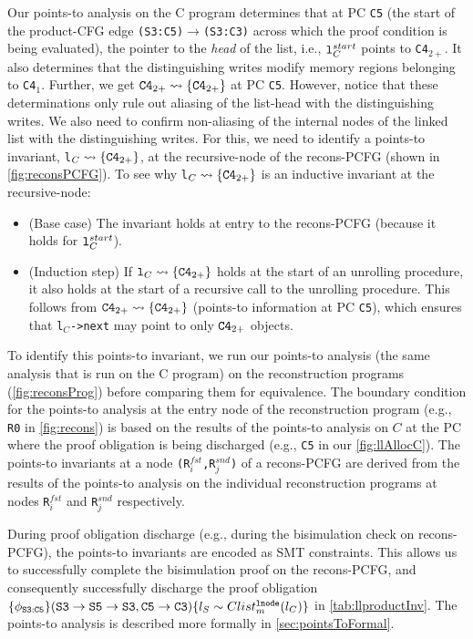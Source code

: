 Our points-to analysis on
the C program determines that at PC {\tt C5} (the start of
the product-CFG edge {\tt (S3:C5)$\rightarrow$(S3:C3)} across which the proof
condition is being evaluated),
the pointer to the {\em head}
of the list, i.e., ${\tt l}^{start}_C$
points to {\tt C4}$_{2+}$. It also determines that the distinguishing
writes modify memory regions belonging to {\tt C4}$_1$. 
Further, we get ${\tt C4}_{2+}\rightsquigarrow{}\{{\tt C4}_{2+}\}$ at PC {\tt C5}.
However,
notice that these determinations only rule out aliasing of the list-head with
the distinguishing writes. We also need to confirm non-aliasing
of the internal nodes of the linked list with the distinguishing
writes.
For this, we need to identify a points-to invariant,
{\tt l}$_C\rightsquigarrow{}\{{\tt C4}_{2+}\}$, at the recursive-node
of the recons-PCFG
(shown in \cref{fig:reconsPCFG}).
To see why {\tt l}$_C\rightsquigarrow{}\{{\tt C4}_{2+}\}$ is
an inductive invariant at the recursive-node:
\begin{itemize}
\item (Base case) The invariant holds
at entry to the recons-PCFG (because it holds for ${\tt l}^{start}_C$).
\item (Induction step) If ${\tt l}_C\rightsquigarrow{}\{{\tt C4}_{2+}\}$
holds at the start of an unrolling procedure,
it also holds at the start of a recursive call to the
unrolling procedure. This
follows from ${\tt C4}_{2+}\rightsquigarrow{}\{{\tt C4}_{2+}\}$ (points-to information at PC {\tt C5}),
which ensures that {\tt l$_C$->next} may point to only ${\tt C4}_{2+}$ objects.
\end{itemize}

To identify this points-to invariant, we run
our points-to analysis (the same analysis that is run
on the C program) on the reconstruction programs (\cref{fig:reconsProg})
before
comparing them for equivalence. The boundary
condition for the points-to analysis at the
entry node of the reconstruction
program (e.g., {\tt R0} in \cref{fig:recons}) is based on
the results of the points-to analysis
on $C$ at the PC where the proof obligation is being discharged (e.g., {\tt C5}
in our \cref{fig:llAllocC}). The points-to invariants
at a node {\tt (R$^{fst}_i$,R$^{snd}_j$)} of a recons-PCFG are
derived from the results of the points-to analysis on the individual
reconstruction programs at nodes {\tt R}$^{fst}_i$ and {\tt R}$^{snd}_j$
respectively.

During proof obligation discharge (e.g., during the bisimulation
check on recons-PCFG), the points-to invariants are encoded as SMT constraints.
This allows us to successfully
complete the bisimulation proof on the recons-PCFG, and
consequently successfully discharge the
proof obligation
$\{\phi_{{\tt S3:C5}}\}\\({\tt S3\rightarrow S5\rightarrow S3}, {\tt C5\rightarrow C3}) \{l_{S}\sim{}Clist^{{\tt lnode}}_{m}(l_{C})\}$ in \cref{tab:llproductInv}.
The points-to analysis is described more formally
in \cref{sec:pointsToFormal}.

